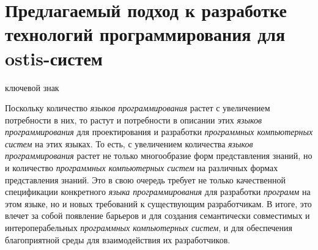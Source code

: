 \section{Предлагаемый подход к разработке технологий программирования для ostis-систем}
\label{sec_programs_solution}

\begin{SCn}

\begin{scnrelfromlist}{ключевой знак}
\end{scnrelfromlist}

\end{SCn}

Поскольку количество \textit{языков программирования} растет с увеличением потребности в них, то растут и потребности в описании этих \textit{языков программирования} для проектирования и разработки \textit{программных компьютерных систем} на этих языках. То есть, с увеличением количества \textit{языков программирования} растет не только многообразие форм представления знаний, но и количество \textit{программных компьютерных систем} на различных формах представления знаний. Это в свою очередь требует не только качественной спецификации конкретного \textit{языка программирования} для разработки \textit{программ} на этом языке, но и новых требований к существующим разработчикам. В итоге, это влечет за собой появление барьеров и для создания семантически совместимых и интероперабельных \textit{программных компьютерных систем}, и для обеспечения благоприятной среды для взаимодействия их разработчиков.

